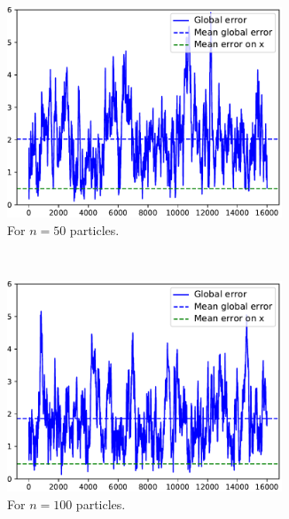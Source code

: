 \documentclass[english, DIV=13]{scrartcl}
\begin{document}
\begin{figure}
    \centering
    \begin{subfigure}{0.49\textwidth}
        \centering
        \includegraphics[width=0.9\textwidth]{figures/error-50}
        \caption{For $n=50$ particles.} 
        \label{fig:q3-error-50}
    \end{subfigure}%
    ~
    \begin{subfigure}{0.49\textwidth}
        \centering
        \includegraphics[width=0.9\textwidth]{figures/error-100}
        \caption{For $n=100$ particles.} 
        \label{fig:q3-error-100}
    \end{subfigure}\\
    \begin{subfigure}{0.49\textwidth}
        \centering

\end{subfigure}
\end{figure}
\end{document}

